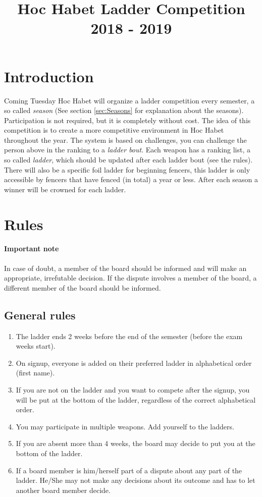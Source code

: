 \documentclass{article}
\title{Hoc Habet Ladder Competition \\ 2018 - 2019}
\author{}
\date{}
\begin{document}
\maketitle
\section{Introduction}
Coming Tuesday Hoc Habet will organize a ladder competition every semester, a so called \emph{season} (See section \ref{sec:Seasons} for explanation about the seasons). Participation is not required, but it is completely without cost. The idea of this competition is to create a more competitive environment in Hoc Habet throughout the year. The system is based on challenges, you can challenge the person above in the ranking to a \emph{ladder bout}. Each weapon has a ranking list, a so called \emph{ladder}, which should be updated after each ladder bout (see the rules). There will also be a specific foil ladder for beginning fencers, this ladder is only accessible by fencers that have fenced (in total) a year or less. After each season a winner will be crowned for each ladder.

\section{Rules}
\paragraph{Important note} In case of doubt, a member of the board should be informed and will make an appropriate, irrefutable decision. If the dispute involves a member of the board, a different member of the board should be informed.
\subsection{General rules}
\begin{enumerate}
    \item The ladder ends 2 weeks before the end of the semester (before the exam weeks start).
    \item On signup, everyone is added on their preferred ladder in alphabetical order (first name). 
    \item If you are not on the ladder and you want to compete after the signup, you will be put at the bottom of the ladder, regardless of the correct alphabetical order.
    \item You may participate in multiple weapons. Add yourself to the ladders.
    \item If you are absent more than 4 weeks, the board may decide to put you at the bottom of the ladder.
    \item If a board member is him/herself part of a dispute about any part of the ladder. He/She may not make any decisions about its outcome and has to let another board member decide.
\end{enumerate}
\end{document}
